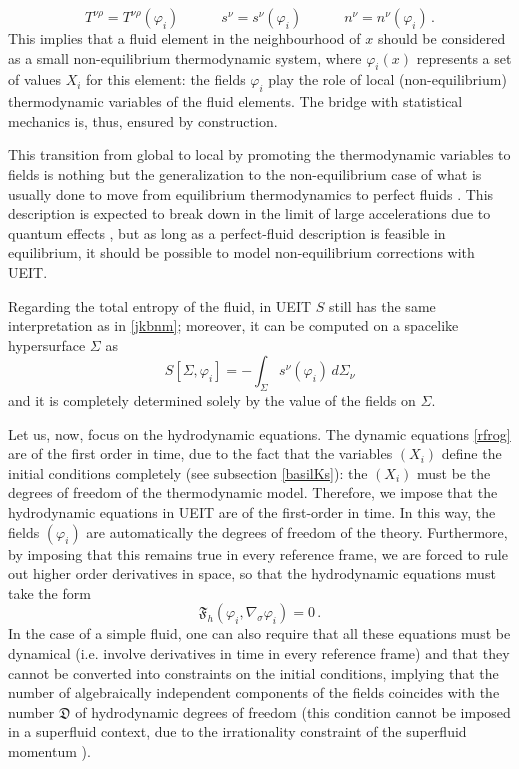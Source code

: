 \documentclass[a4paper, amsfonts, amssymb, amsmath, reprint, twocolumn, showkeys, nofootinbib]{revtex4-2}
\begin{document}
\begin{equation}\label{constitutiverelationszzzUEIT}
 T^{\nu \rho} = T^{\nu \rho}(\varphi_i) \quad \quad\quad
 s^\nu = s^\nu (\varphi_i) \quad \quad \quad
 n^\nu = n^\nu (\varphi_i) \, .
\end{equation}
This implies that a fluid element in the neighbourhood of $x$ should be considered as a small non-equilibrium thermodynamic system, where $\varphi_i(x)$ represents a set of values $X_i$ for this element: the fields $\varphi_i$ play the role of local (non-equilibrium) thermodynamic variables of the fluid elements. 
The bridge with statistical mechanics is, thus, ensured by construction.

This transition from global to local by promoting the thermodynamic variables to fields is nothing but the generalization to the non-equilibrium case of what is usually done to move from equilibrium thermodynamics to perfect fluids \citep{MTW_book}. This description is expected to break down in the limit of large accelerations due to quantum effects \cite{BecattiniQuantumCorrections2015}, but as long as a perfect-fluid description is feasible in equilibrium, it should be possible to model non-equilibrium corrections with UEIT.

Regarding the total entropy of the fluid, in UEIT $S$ still has the same interpretation as in \eqref{jkbnm}; moreover, it can be computed on a spacelike hypersurface $\Sigma$ as
\begin{equation}\label{INT1}
S[\Sigma,\varphi_i] = -\int_\Sigma s^\nu(\varphi_i) \, d\Sigma_\nu
\end{equation}
and it is completely determined solely by the value of the fields on $\Sigma$. 

Let us, now, focus on the hydrodynamic equations. The dynamic equations \eqref{rfrog} are of the first order in time, due to the fact that the variables $(X_i)$ define the initial conditions completely (see subsection \ref{basilKs}): the $(X_i)$ must be the degrees of freedom of the thermodynamic model. Therefore,  we impose that the hydrodynamic equations in UEIT are of the first-order in time. 
In this way, the fields $(\varphi_i)$ are automatically the degrees of freedom of the theory. Furthermore, by imposing that this remains true in every reference frame, we are forced to rule out higher order derivatives in space, so that the hydrodynamic equations must take the form
\begin{equation}\label{hydrouzZZUEIT}
\mathfrak{F}_h(\varphi_i,\nabla_\sigma \varphi_i)=0 \, . 
\end{equation} 
In the case of a simple fluid, one can also require that all these equations must be dynamical (i.e. involve derivatives in time in every reference frame) and that they cannot be converted into constraints on the initial conditions, implying  that the number of algebraically independent components of the fields coincides with the number $\mathfrak{D}$ of hydrodynamic degrees of freedom (this condition cannot be imposed in a superfluid context, due to the irrationality constraint of the superfluid momentum \cite{carter92,cool1995}).
\end{document}
